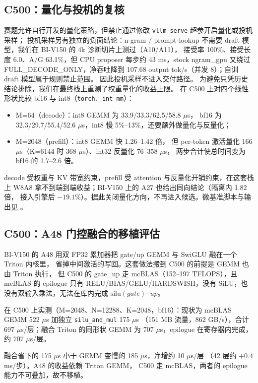\subsection{C500：量化与投机的复核}\label{sec:quant-spec}
赛题允许自行开发的量化策略，但禁止通过修改 \texttt{vllm serve} 超参开启量化或投机采样；
投机采样另有独立的负面结论：n-gram / prompt-lookup 不需要 draft 模型，我们在 BI-V150 的 4k 诊断切片上测过（A10/A11），
接受率 100\%、接受长度 6.0、A/G 63.1\%，但 CPU proposer 每步约 43 ms，stock ngram\_gpu 又绕过
FULL\_DECODE\_ONLY，净吞吐降到 107.68 output tok/s（并发 8）；自训 draft 模型属于规则禁止范围。
因此投机采样不进入交付路径。
为避免只凭历史结论排除，我们在最终栈上重测了权重量化的收益上限。
在 C500 上对四个线性形状比较 bf16 与 int8（\texttt{torch.\_int\_mm}）：

\begin{itemize}[leftmargin=2em]
\item M=64（decode）：int8 GEMM 为 33.9/33.3/62.5/58.8 $\mu$s，
bf16 为 32.3/29.7/55.4/52.6 $\mu$s，int8 慢 5\%--13\%，还要额外做量化与反量化；
\item M=2048（prefill）：int8 GEMM 快 1.26--1.42 倍，
但 per-token 激活量化 166 $\mu$s（K=6144 时 368 $\mu$s）、int32 反量化 76--358 $\mu$s，
两步合计使总时间变为 bf16 的 1.7--2.6 倍。
\end{itemize}

decode 受权重与 KV 带宽约束，prefill 受 attention 与反量化开销约束，在这套栈上
W8A8 拿不到端到端收益；BI-V150 上的 A27 也给出同向结论（隔离内 1.82 倍，
接入引擎后 $-19.1\%$）。据此关闭量化方向，不再进入候选。微基准脚本与输出见
。

\subsection{C500：A48 门控融合的移植评估}\label{sec:a48-port}
\begin{sloppypar}
BI-V150 的 A48 用双 FP32 累加器把 gate/up GEMM 与 SwiGLU 融在一个 Triton 内核里，
省掉中间激活的写回。这套做法搬到 C500 的前提是 GEMM 也由 Triton 执行，
但 C500 的 gate\_up 走 mcBLAS（152--197 TFLOPS），且 mcBLAS 的 epilogue 只有
RELU/BIAS/GELU/HARDSWISH，没有 SiLU，也没有双输入乘法，无法在库内完成
\(\mathrm{silu}(gate)\cdot up\)。

在 C500 上实测（M=2048、N=12288、K=2048，bf16）：现状为 mcBLAS GEMM 522 $\mu$s 加独立 \texttt{silu\_and\_mul} 175 $\mu$s
（151 MB 流量，862 GB/s），合计 697 $\mu$s/层；融合 Triton 的同形状 GEMM 为 707 $\mu$s，epilogue 在寄存器内完成，约 707 $\mu$s/层。

\enlargethispage{5\baselineskip}融合省下的 175 $\mu$s 小于 GEMM 变慢的 185 $\mu$s，净增约 10 $\mu$s/层
（42 层约 $+0.4$ ms/步）。A48 的收益依赖 Triton GEMM，
C500 走 mcBLAS，两者的 epilogue 能力不可叠加，故不移植。
\end{sloppypar}
